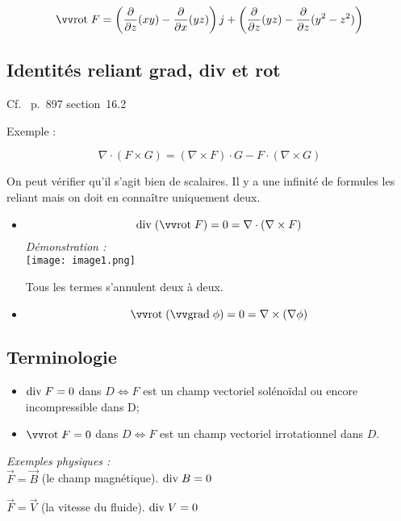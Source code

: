\[\rot F = \left( \frac{\partial }{\partial z} (xy) -\frac{\partial }{\partial x} (yz) \right) j
+\left( \frac{\partial }{\partial z} (yz) -\frac{\partial }{\partial z} (y^2-z^2) \right)
 \]



 \subsection{Identités reliant grad, div et rot}

 Cf.~\cite{adams2013calculus} p.~897 section~16.2

 Exemple :

 \[\nabla \cdot ( F \times G) = ( \nabla \times F) \cdot G - F \cdot(\nabla \times G ) \]

 On peut vérifier qu'il s'agit bien de scalaires. Il y a une infinité de formules les reliant mais on doit en connaître uniquement deux.

 \begin{itemize}
 \item
 \[\divt(\rot F ) = 0 = \nabla \cdot ( \nabla \times F ) \]
\textit{Démonstration :} \\

 \texttt{[image: image1.png]}

 Tous les termes s'annulent deux à deux.
 \item
 \[\rot ( \gradt\phi) =0 = \nabla \times ( \nabla \phi ) \]

 \end{itemize}
 \subsection{Terminologie}
\begin{itemize}


\item
 $\mathrm{div}\; F = 0$ dans $D \Leftrightarrow F$ est un champ vectoriel \og solénoïdal \fg{} ou encore \og incompressible \fg{} dans D;

\item $\rot F = 0$ dans $D \Leftrightarrow F$ est un champ vectoriel \og irrotationnel \fg{} dans $D$.

\end{itemize}
\textit{ Exemples physiques :} \\

 $\vec F= \vec B$ (le champ magnétique). $\mathrm{div}\; B = 0$

 $\vec F= \vec V$ (la vitesse du fluide). $\mathrm{div}\; V = 0$

